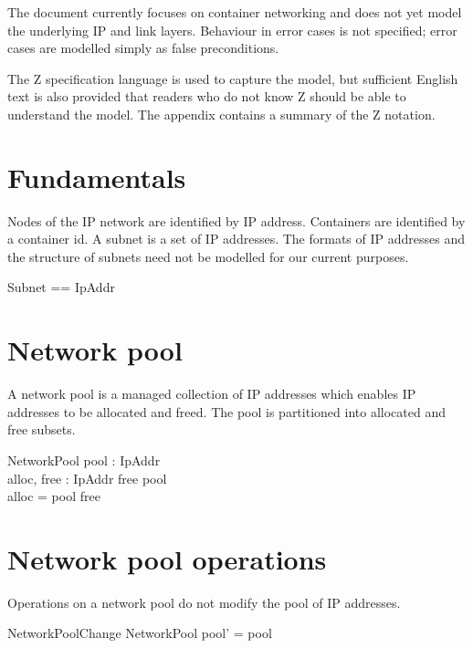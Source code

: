 \documentclass[a4paper,twoside,12pt]{article}
\begin{document}
The document currently focuses on container networking and does not yet model the underlying IP and link layers. Behaviour in error cases is not specified; error cases are modelled simply as false preconditions.

The Z specification language is used to capture the model, but sufficient English text is also provided that readers who do not know Z should be able to understand the model. The appendix contains a summary of the Z notation.

\section{Fundamentals}

Nodes of the IP network are identified by IP address. Containers are identified by a container id. A subnet is a set of IP addresses. The formats of IP addresses and the structure of subnets need not be modelled for our current purposes.
\begin{zed}
\also
Subnet == \power IpAddr
\end{zed}

\newpage
\section{Network pool}

A network pool is a managed collection of IP addresses which enables IP addresses to be allocated and freed. The pool is partitioned into allocated and free subsets.
\begin{schema}{NetworkPool}
pool : \power IpAddr \\
alloc, free : \power IpAddr
\where
free \subseteq pool \\
alloc = pool \setminus free
\end{schema}

\section{Network pool operations}

Operations on a network pool do not modify the pool of IP addresses.
\begin{schema}{NetworkPoolChange}
\Delta NetworkPool
\where
pool' = pool
\end{schema}
\end{document}
